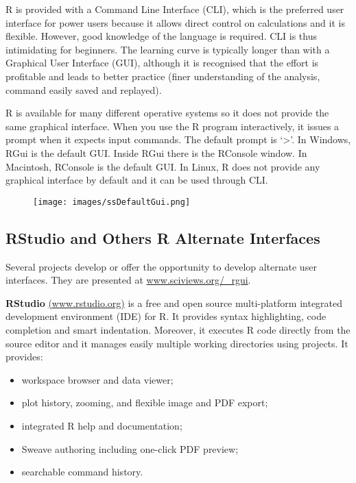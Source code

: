 \documentclass[]{book}
\providecommand{\tightlist}{%
  \setlength{\itemsep}{0pt}\setlength{\parskip}{0pt}}
\def\tightlist{}
\begin{document}
R is provided with a Command Line Interface (CLI), which is the
preferred user interface for power users because it allows direct
control on calculations and it is flexible. However, good knowledge of
the language is required. CLI is thus intimidating for beginners. The
learning curve is typically longer than with a Graphical User Interface
(GUI), although it is recognised that the effort is profitable and leads
to better practice (finer understanding of the analysis, command easily
saved and replayed).

R is available for many different operative systems so it does not
provide the same graphical interface. When you use the R program
interactively, it issues a prompt when it expects input commands. The
default prompt is `\textgreater{}'. In Windows, RGui is the default GUI.
Inside RGui there is the RConsole window. In Macintosh, RConsole is the
default GUI. In Linux, R does not provide any graphical interface by
default and it can be used through CLI.

\begin{figure}[htbp]
\centering
\texttt{[image: images/ssDefaultGui.png]}
\caption{}
\end{figure}

\clearpage

\subsection{RStudio and Others R Alternate
Interfaces}\label{rstudio-and-others-r-alternate-interfaces}

Several projects develop or offer the opportunity to develop alternate
user interfaces. They are presented at
\href{http://www.sciviews.org/_rgui/}{www.sciviews.org/\_rgui}.

\textbf{RStudio} \href{http://www.rstudio.org/}{(www.rstudio.org)} is a
free and open source multi-platform integrated development environment
(IDE) for R. It provides syntax highlighting, code completion and smart
indentation. Moreover, it executes R code directly from the source
editor and it manages easily multiple working directories using
projects. It provides:

\begin{itemize}
\tightlist
\item
  workspace browser and data viewer;
\item
  plot history, zooming, and flexible image and PDF export;
\item
  integrated R help and documentation;
\item
  Sweave authoring including one-click PDF preview;
\item
  searchable command history.
\end{itemize}
\end{document}
